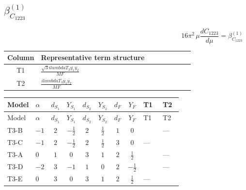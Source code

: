 \documentclass[8pt]{article}
\begin{document}
\begin{landscape}
\section*{$\beta_{C_{1223}}^{(1)}$}
\[16\pi^2\,\mu\frac{d C_{1223}}{d\mu}=\beta_{C_{1223}}^{(1)}\]
\begin{center}
\begin{tabular}{@{}c >{\raggedright\arraybackslash}p{0.82\linewidth}@{}}
\toprule
Column & Representative term structure \\
\midrule
T1 & \(\displaystyle \frac{\sqrt{3} i lambdaT_{3} \overline{y_{1}} \overline{y_{2}}}{MF}\) \\
\midrule
T2 & \(\displaystyle \frac{i lambdaT_{3} \overline{y_{1}} \overline{y_{2}}}{MF}\) \\
\midrule
\bottomrule
\end{tabular}
\end{center}
\smallskip
\tiny
\begin{longtable}{@{}llcccccc >{\raggedright\arraybackslash}p{0.21\linewidth} >{\raggedright\arraybackslash}p{0.21\linewidth}@{}}
\toprule
Model & $\alpha$ & $d_{S_1}$ & $Y_{S_1}$ & $d_{S_2}$ & $Y_{S_2}$ & $d_F$ & $Y_F$ & T1 & T2 \\
\midrule
\endfirsthead
\toprule
Model & $\alpha$ & $d_{S_1}$ & $Y_{S_1}$ & $d_{S_2}$ & $Y_{S_2}$ & $d_F$ & $Y_F$ & T1 & T2 \\
\midrule
\endhead
T3-B & $-1$ & $2$ & $-\frac{1}{2}$ & $2$ & $\frac{1}{2}$ & $1$ & $0$ & \scriptsize\adjustbox{max width=\linewidth}{$\begin{gathered} - \frac{\sqrt{3} i lambdaT_{3} \overline{y_{1}} \overline{y_{2}}}{3 MF}\end{gathered}$} & --- \\
\midrule
T3-C & $-1$ & $2$ & $-\frac{1}{2}$ & $2$ & $\frac{1}{2}$ & $3$ & $0$ & --- & \scriptsize\adjustbox{max width=\linewidth}{$\begin{gathered} \frac{2 i lambdaT_{3} \overline{y_{1}} \overline{y_{2}}}{3 MF}\end{gathered}$} \\
\midrule
T3-A & $0$ & $1$ & $0$ & $3$ & $1$ & $2$ & $\frac{1}{2}$ & \scriptsize\adjustbox{max width=\linewidth}{$\begin{gathered} - \frac{\sqrt{3} i lambdaT_{3} \overline{y_{1}} \overline{y_{2}}}{3 MF}\end{gathered}$} & --- \\
\midrule
T3-D & $-2$ & $3$ & $-1$ & $1$ & $0$ & $2$ & $-\frac{1}{2}$ & \scriptsize\adjustbox{max width=\linewidth}{$\begin{gathered} - \frac{\sqrt{3} i lambdaT_{3} \overline{y_{1}} \overline{y_{2}}}{3 MF}\end{gathered}$} & --- \\
\midrule
T3-E & $0$ & $3$ & $0$ & $3$ & $1$ & $2$ & $\frac{1}{2}$ & --- & \scriptsize\adjustbox{max width=\linewidth}{$\begin{gathered} \frac{i lambdaT_{3} \overline{y_{1}} \overline{y_{2}}}{MF}\end{gathered}$} \\
\midrule
\bottomrule
\end{longtable}
\clearpage

\end{landscape}
\end{document}
